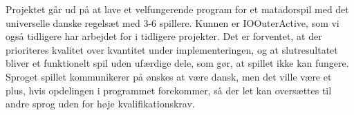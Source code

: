 \documentclass[class=article, crop=false]{standalone}
\begin{document}
    Projektet går ud på at lave et velfungerende program for et matadorspil med det universelle danske regelsæt med 3-6 spillere. Kunnen er IOOuterActive, som vi også tidligere har arbejdet for i tidligere projekter. Det er forventet, at der prioriteres kvalitet over kvantitet under implementeringen, og at slutresultatet bliver et funktionelt spil uden ufærdige dele, som gør, at spillet ikke kan fungere. Sproget spillet kommunikerer på ønskes at være dansk, men det ville være et plus, hvis opdelingen i programmet forekommer, så der let kan oversættes til andre sprog uden for høje kvalifikationskrav.
\end{document}
